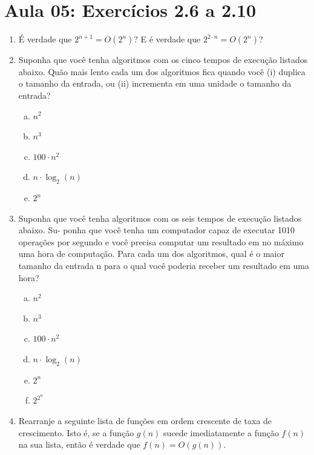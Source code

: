 \documentclass[a4paper,10pt]{article}
\begin{document}
\newpage
\section{Aula 05: Exercícios 2.6 a 2.10}

\begin{enumerate}
 
 
\item É verdade que $2^{n+1} = O(2^n)$? E é verdade que $2^{2 \cdot n} = O(2^n)$?

\item Suponha que você tenha algoritmos com os cinco tempos de execução listados abaixo.
Quão mais lento cada um dos algoritmos fica quando você (i) duplica o tamanho da
entrada, ou (ii) incrementa em uma unidade o tamanho da entrada?

  \begin{enumerate}[(a)]
\item $n^2$
\item $n^3$
\item $100 \cdot n^2$
\item $n \cdot \log_2(n)$
\item $2^n$
  \end{enumerate}

\item Suponha que você tenha algoritmos com os seis tempos de execução listados abaixo. Su-
ponha que você tenha um computador capaz de executar 1010 operações por segundo
e você precisa computar um resultado em no máximo uma hora de computação. Para
cada um dos algoritmos, qual é o maior tamanho da entrada n para o qual você poderia
receber um resultado em uma hora?

  \begin{enumerate}[(a)]
\item $n^2$
\item $n^3$
\item $100\cdot n^2$
\item $n\cdot \log_2(n)$
\item $2^n$
\item $2^{2^n}$

  \end{enumerate}

\item Rearranje a seguinte lista de funções em ordem crescente de taxa de crescimento. Isto é,
se a função $g(n)$ sucede imediatamente a função $f(n)$ na sua lista, então é verdade que $f(n) = O(g(n))$.


\begin{center}
 

\end{center}
\end{enumerate}
\end{document}
